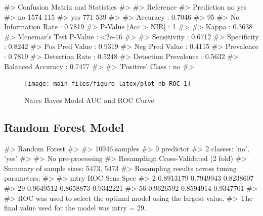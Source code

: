 \begin{Schunk}
\begin{Soutput}
#> Confusion Matrix and Statistics
#> 
#>           Reference
#> Prediction   no  yes
#>        no  1574  115
#>        yes  771  539
#>                                           
#>                Accuracy : 0.7046          
#>                  95%
#>     No Information Rate : 0.7819          
#>     P-Value [Acc > NIR] : 1               
#>                                           
#>                   Kappa : 0.3638          
#>  Mcnemar's Test P-Value : <2e-16          
#>                                           
#>             Sensitivity : 0.6712          
#>             Specificity : 0.8242          
#>          Pos Pred Value : 0.9319          
#>          Neg Pred Value : 0.4115          
#>              Prevalence : 0.7819          
#>          Detection Rate : 0.5248          
#>    Detection Prevalence : 0.5632          
#>       Balanced Accuracy : 0.7477          
#>                                           
#>        'Positive' Class : no              
#> 
\end{Soutput}
\end{Schunk}

\begin{Schunk}
\begin{figure}[H]

{\centering \texttt{[image: main\_files/figure-latex/plot\_nb\_ROC-1]} 

}

\caption[Naive Bayes Model AUC and ROC Curve]{Naive Bayes Model AUC and ROC Curve}\label{fig:plot_nb_ROC}
\end{figure}
\end{Schunk}

\hypertarget{random-forest-model}{%
\subsection{Random Forest Model}\label{random-forest-model}}

\begin{Schunk}
\begin{Soutput}
#> Random Forest 
#> 
#> 10946 samples
#>     9 predictor
#>     2 classes: 'no', 'yes' 
#> 
#> No pre-processing
#> Resampling: Cross-Validated (2 fold) 
#> Summary of sample sizes: 5473, 5473 
#> Resampling results across tuning parameters:
#> 
#>   mtry  ROC        Sens       Spec     
#>    2    0.8913179  0.7949943  0.8238607
#>   29    0.9649512  0.8658873  0.9342221
#>   56    0.9626592  0.8594914  0.9347701
#> 
#> ROC was used to select the optimal model using the largest value.
#> The final value used for the model was mtry = 29.
\end{Soutput}
\end{Schunk}

